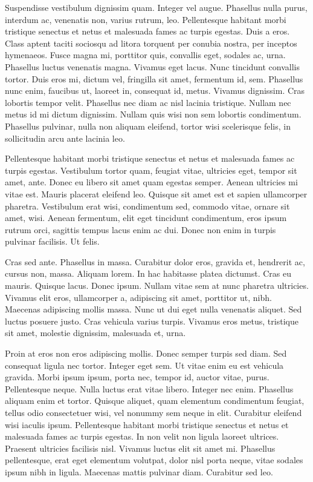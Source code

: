Suspendisse vestibulum dignissim quam. Integer vel augue. Phasellus nulla
purus, interdum ac, venenatis non, varius rutrum, leo. Pellentesque habitant
morbi tristique senectus et netus et malesuada fames ac turpis egestas. Duis a
eros. Class aptent taciti sociosqu ad litora torquent per conubia nostra, per
inceptos hymenaeos. Fusce magna mi, porttitor quis, convallis eget, sodales ac,
urna. Phasellus luctus venenatis magna. Vivamus eget lacus. Nunc tincidunt
convallis tortor. Duis eros mi, dictum vel, fringilla sit amet, fermentum id,
sem. Phasellus nunc enim, faucibus ut, laoreet in, consequat id, metus. Vivamus
dignissim. Cras lobortis tempor velit. Phasellus nec diam ac nisl lacinia
tristique. Nullam nec metus id mi dictum dignissim. Nullam quis wisi non sem
lobortis condimentum. Phasellus pulvinar, nulla non aliquam eleifend, tortor
wisi scelerisque felis, in sollicitudin arcu ante lacinia leo.

Pellentesque habitant morbi tristique senectus et netus et malesuada fames ac
turpis egestas. Vestibulum tortor quam, feugiat vitae, ultricies eget, tempor
sit amet, ante. Donec eu libero sit amet quam egestas semper. Aenean ultricies
mi vitae est. Mauris placerat eleifend leo. Quisque sit amet est et sapien
ullamcorper pharetra. Vestibulum erat wisi, condimentum sed, commodo vitae,
ornare sit amet, wisi. Aenean fermentum, elit eget tincidunt condimentum, eros
ipsum rutrum orci, sagittis tempus lacus enim ac dui. Donec non enim in turpis
pulvinar facilisis. Ut felis.

Cras sed ante. Phasellus in massa. Curabitur dolor eros, gravida et, hendrerit
ac, cursus non, massa. Aliquam lorem. In hac habitasse platea dictumst. Cras eu
mauris. Quisque lacus. Donec ipsum. Nullam vitae sem at nunc pharetra
ultricies. Vivamus elit eros, ullamcorper a, adipiscing sit amet, porttitor ut,
nibh. Maecenas adipiscing mollis massa. Nunc ut dui eget nulla venenatis
aliquet. Sed luctus posuere justo. Cras vehicula varius turpis. Vivamus eros
metus, tristique sit amet, molestie dignissim, malesuada et, urna.

Proin at eros non eros adipiscing mollis. Donec semper turpis sed diam. Sed
consequat ligula nec tortor. Integer eget sem. Ut vitae enim eu est vehicula
gravida. Morbi ipsum ipsum, porta nec, tempor id, auctor vitae, purus.
Pellentesque neque. Nulla luctus erat vitae libero. Integer nec enim. Phasellus
aliquam enim et tortor. Quisque aliquet, quam elementum condimentum feugiat,
tellus odio consectetuer wisi, vel nonummy sem neque in elit. Curabitur
eleifend wisi iaculis ipsum. Pellentesque habitant morbi tristique senectus et
netus et malesuada fames ac turpis egestas. In non velit non ligula laoreet
ultrices. Praesent ultricies facilisis nisl. Vivamus luctus elit sit amet mi.
Phasellus pellentesque, erat eget elementum volutpat, dolor nisl porta neque,
vitae sodales ipsum nibh in ligula. Maecenas mattis pulvinar diam. Curabitur
sed leo.

